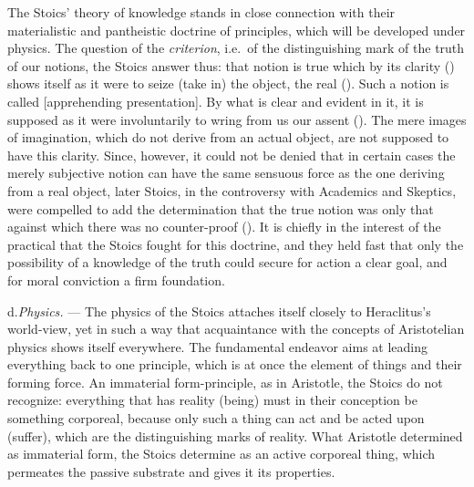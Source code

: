 The Stoics' theory of knowledge stands in close connection with their
materialistic and pantheistic doctrine of principles, which will be developed
under physics.
The question of the \emph{criterion}, i.e.\ of the distinguishing
mark of the truth of our notions, the Stoics answer thus: that notion is true
which by its clarity () shows itself as it were to seize (take
in) the object, the real (). Such a notion is called
 [apprehending presentation]. By what is clear and
evident in it, it is supposed as it were involuntarily to wring from us our
assent (). The mere images of imagination, which do not
derive from an actual object, are not supposed to have this clarity. Since,
however, it could not be denied that in certain cases the merely subjective
notion can have the same sensuous force as the one deriving from a real
object, later Stoics, in the controversy with Academics and Skeptics, were
compelled to add the determination that the true notion was only that
 against which there was no counter-proof
(). It is chiefly in the interest of the practical
that the Stoics fought for this doctrine, and they held fast that only the
possibility of a knowledge of the truth could secure for action a clear goal,
and for moral conviction a firm foundation.

\divrule

d.\enspace \emph{Physics.} --- The physics of the Stoics attaches itself
closely to Heraclitus's world-view, yet in such a way that acquaintance
with the concepts of Aristotelian physics shows itself everywhere. The
fundamental endeavor aims at leading everything back to one principle,
which is at once the element of things and their forming force. An
immaterial form-principle, as in Aristotle, the Stoics do not recognize:
everything that has reality (being) must in their conception be something
corporeal, because only such a thing can act and be acted upon (suffer),
which are the distinguishing marks of reality. What Aristotle determined
as immaterial form, the Stoics determine as an active corporeal thing,
which permeates the passive substrate and gives it its properties.

